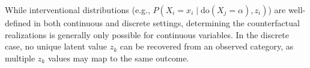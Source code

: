 While interventional distributions (e.g., $P(X_i = x_i \mid \text{do}(X_j = \alpha), z_i)$) are well-defined in both continuous and discrete settings, determining the counterfactual realizations is generally only possible for continuous variables. In the discrete case, no unique latent value $z_k$ can be recovered from an observed category, as multiple $z_k$ values may map to the same outcome. 

% 
% 
% 
% 
% 
% 
